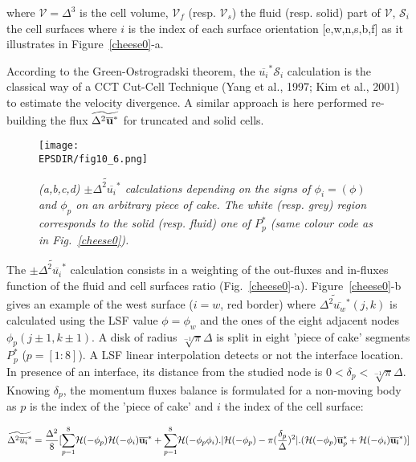 where $\mathcal V= \Delta^3$ is the cell volume, $\mathcal V_f$ (resp. $\mathcal V_s$) the fluid (resp. solid) part of $\mathcal V$, ${\mathcal S_i}$ the cell surfaces where $i$ is the index of each surface orientation [e,w,n,s,b,f] as it illustrates in Figure~\ref{cheese0}-a. 

According to the Green-Ostrogradski theorem, the $\overline{u_i}^{*} {\mathcal S_i}$ calculation is the classical way of a CCT Cut-Cell Technique (Yang et al., 1997; Kim et al., 2001) to estimate the velocity divergence. A similar approach is here performed re-building the flux $\widetilde{\Delta^2 \overline{\bf{u}}^{*}}$ for truncated and solid cells.

\begin{figure}[!ht]
\begin{center}
   \texttt{[image: \\EPSDIR/fig10\_6.png]} \\	
		\vspace{-1mm} 	
	\small \caption {{\it (a,b,c,d) $\pm \widetilde{\Delta^2 \overline{u_i}^{*}}$ calculations depending on the signs of $\phi_i=(\phi)$ and $\phi_p$ on an arbitrary piece of cake. The white (resp. grey) region corresponds to the solid (resp. fluid) one of $P_p^*$ (same colour code as in Fig.~\ref{cheese0}).}}
\label{cheese1}
\end{center}
\end{figure}

The $\pm \widetilde{\Delta^2 \overline{u_i}^{*}}$ calculation consists in a weighting of the out-fluxes and in-fluxes function of the fluid and cell surfaces ratio (Fig.~\ref{cheese0}-a). Figure~\ref{cheese0}-b gives an example of the west surface ($i=w$, red border) where $\widetilde{\Delta^2 \overline{u_w}^{*}}(j,k)$ is calculated using the LSF value $\phi=\phi_w$ and the ones of the eight adjacent nodes $\phi_p(j \pm 1,k \pm 1)$. A disk of radius $\sqrt[-1]{\pi}\Delta$ is split in eight 'piece of cake' segments $P_p^*$ ($p=[1:8]$). A LSF linear interpolation detects or not the interface location. In presence of an interface, its distance from the studied node is $0<\delta_p<\sqrt[-1]{\pi}\Delta$. Knowing $\delta_p$, the momentum fluxes balance is formulated for a non-moving body as $p$ is the index of the 'piece of cake' and $i$ the index of the cell surface:

\vspace{-0.25cm}
\begin{equation}
\widetilde{\Delta^2 \overline{u_i}^{*}} = \frac{\Delta^2}{8}[\overset{8}{\underset{p=1}{\sum}} {\mathcal H}(-\phi_p){\mathcal H}(-\phi_i)\overline{{\bf u_i}}^{*}
                    +\overset{8}{\underset{p=1}{\sum}} {\mathcal H}(-\phi_p\phi_i).|{\mathcal H}(-\phi_p)-\pi(\frac{\delta_p}{\Delta})^2|.
						 ({\mathcal H}(-\phi_p)\overline{{\bf u}}_p^{*}+{\mathcal H}(-\phi_i)\overline{{\bf u_i}}^{*})]
\label{eqn_pres3}						
\end{equation}
\vspace{-0.25cm}

